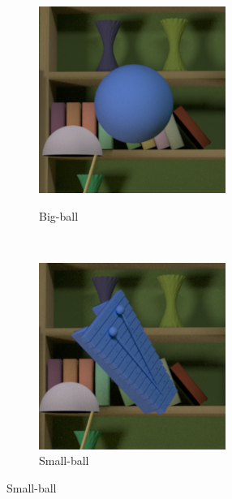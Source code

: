 \documentclass{jov}
\begin{document}
\begin{figure}
\centering
\begin{subfigure}[b]{0.14 \textwidth}
        \caption{Big-ball}
        \includegraphics[width=\textwidth]{../FiguresDraft4/Figure4/Figure4_a.png}
        \label{fig:libraryWithBigBall}
    \end{subfigure}
    ~ 
\begin{subfigure}[b]{0.14 \textwidth}
        \caption{Small-ball}
        \includegraphics[width=\textwidth]{../FiguresDraft4/Figure4/Figure4_b.png}

\end{subfigure}
\end{figure}
\end{document}
